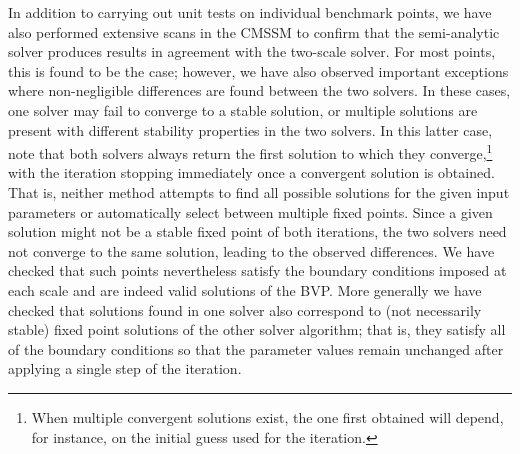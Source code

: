 \documentclass[final,3p,11pt,pdflatex]{elsarticle}
\begin{document}
In addition to carrying out unit tests on individual benchmark points, we have
also performed extensive scans in the CMSSM to confirm that the semi-analytic
solver produces results in agreement with the two-scale solver.  For most
points, this is found to be the case; however, we have also observed important
exceptions where non-negligible differences are found between the two
solvers.  In these cases, one solver may fail to converge to a stable
solution, or multiple solutions are present \cite{Allanach:2013cda} with
different stability properties in the two solvers.  In this latter case, note
that both solvers always return the first solution to
which they converge,\footnote{When multiple convergent solutions exist,
  the one first obtained will depend, for instance, on the initial guess
  used for the iteration.} with the iteration
stopping immediately once a convergent solution is obtained.  That is, neither
method attempts to find all possible solutions for the given input parameters
or automatically select between multiple fixed points.  Since a given solution
might not be a stable fixed point of both iterations, the two solvers need not
converge to the same solution, leading to the observed differences.  We have
checked that such points nevertheless satisfy the boundary conditions imposed at
each scale and are indeed valid solutions of the BVP.  More generally we have
checked that solutions found in one solver also correspond to (not necessarily
stable) fixed point solutions of the other solver algorithm; that is, they
satisfy all of the boundary conditions so that the parameter values remain
unchanged after applying a single step of the iteration.
\end{document}
